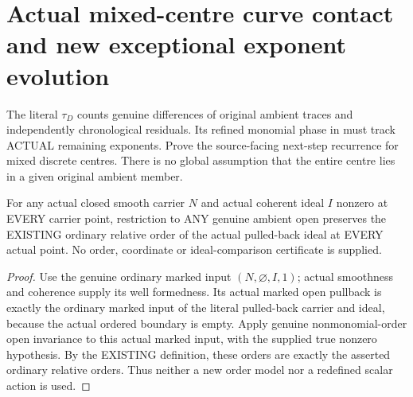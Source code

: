 \section{Actual mixed-centre curve contact and new exceptional exponent evolution}

The literal $\tau_D$ counts genuine differences of original ambient traces
and independently chronological residuals. Its refined monomial phase in
\cite[Lemma~12.8, pp.~294--295]{bierstone-milman97-invent-math} must track
ACTUAL remaining exponents. Prove the source-facing next-step recurrence
for mixed discrete centres. There is no global assumption that the entire
centre lies in a given original ambient member.

\begin{lemma}
\label{hir:sharp-actual-ordinary-trace-order-open-restriction}
\leanok
For any actual closed smooth carrier $N$ and actual coherent ideal $I$
nonzero at EVERY carrier point, restriction to ANY genuine ambient open
preserves the EXISTING ordinary relative order of the actual pulled-back
ideal at EVERY actual point. No order, coordinate or ideal-comparison
certificate is supplied.
\end{lemma}
\begin{proof}
Use the genuine ordinary marked input $(N,\varnothing,I,1)$; actual
smoothness and coherence supply its well formedness. Its actual marked
open pullback is exactly the ordinary marked input of the literal
pulled-back carrier and ideal, because the actual ordered boundary is
empty. Apply genuine nonmonomial-order open invariance to this actual
marked input, with the supplied true nonzero hypothesis. By the EXISTING
definition, these orders are exactly the asserted ordinary relative
orders. Thus neither a new order model nor a redefined scalar action is used.
\end{proof}

